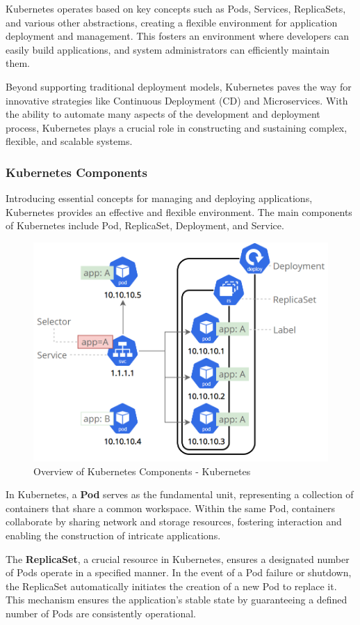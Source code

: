 Kubernetes operates based on key concepts such as Pods, Services, ReplicaSets,
and various other abstractions, creating a flexible environment for application
deployment and management. This fosters an environment where developers can
easily build applications, and system administrators can efficiently maintain
them.

Beyond supporting traditional deployment models, Kubernetes paves the way for
innovative strategies like Continuous Deployment (CD) and Microservices. With
the ability to automate many aspects of the development and deployment process,
Kubernetes plays a crucial role in constructing and sustaining complex,
flexible, and scalable systems.

\subsubsection{Kubernetes Components}
Introducing essential concepts for managing and deploying applications,
Kubernetes provides an effective and flexible environment. The main components
of Kubernetes include Pod, ReplicaSet, Deployment, and Service.

\begin{figure}[H]
    \centering
    \includegraphics[width=0.75\linewidth]{Images/3.4-k8s-comps.png}
    \caption{Overview of Kubernetes Components - Kubernetes}
    \label{fig:k8s-comps}
\end{figure}

In Kubernetes, a \textbf{Pod} serves as the fundamental unit, representing a
collection of containers that share a common workspace. Within the same Pod,
containers collaborate by sharing network and storage resources, fostering
interaction and enabling the construction of intricate applications.

The \textbf{ReplicaSet}, a crucial resource in Kubernetes, ensures a designated
number of Pods operate in a specified manner. In the event of a Pod failure or
shutdown, the ReplicaSet automatically initiates the creation of a new Pod to
replace it. This mechanism ensures the application's stable state by
guaranteeing a defined number of Pods are consistently operational.

